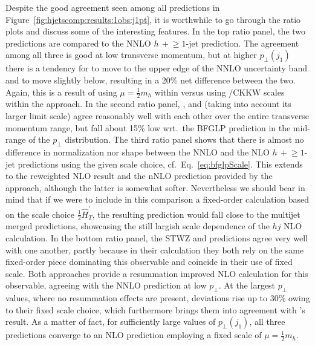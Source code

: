 Despite the good agreement seen among all predictions in
Figure~\ref{fig:hjetscomp:results:1obs:j1pt}, it is worthwhile to go
through the ratio plots and discuss some of the interesting features.
In the top ratio panel, the two \hjetscompNNLOPS predictions are compared to the
NNLO $h\,+\!\ge\!1$-jet prediction. The agreement among all three is
good at low transverse momentum, but at higher $p_\perp(j_1)$ there is
a tendency for \hjetscompSherpa \hjetscompNNLOPS to move to the upper edge of the NNLO 
uncertainty band and \hjetscompPowheg \hjetscompNNLOPS to move slightly below, resulting 
in a 20\% net difference between the two. Again, this is a result of using
$\mu=\tfrac{1}{2}m_h$ within \hjetscompSherpa versus using \hjetscompMinlo/CKKW scales within the
\hjetscompPowheg approach. In the second ratio panel, \hjetscompHerwig, \hjetscompSherpa and \hjetscompMGaMC
(taking into account its larger limit scale) agree reasonably well
with each other over the entire transverse momentum range, but fall
about 15\% low wrt.~the BFGLP prediction in the mid-range of the
$p_\perp$ distribution. The third ratio panel shows that there is almost no
difference in normalization nor shape between the NNLO and the NLO
$h\,+\!\ge\!1$-jet predictions using the given scale choice,
cf.~Eq.~\eqref{eq:bfglpScale}. This extends to the \hjetscompMinlo reweighted
NLO result and the nNLO prediction provided by the \hjetscompLoopsim approach,
although the latter is somewhat softer. Nevertheless we should bear in
mind that if we were to include in this comparison a fixed-order
calculation based on the scale choice $\tfrac{1}{2}\hat H_T^\prime$,
the resulting prediction would fall close to the multijet merged
predictions, showcasing the still largish scale dependence of the $hj$
NLO calculation. In the bottom ratio panel, the STWZ and \hjetscompResbos
predictions agree very well with one another, partly because in their
calculation they both rely on the same fixed-order piece dominating
this observable and coincide in their use of fixed scale. Both
approaches provide a resummation improved NLO calculation for this
observable, agreeing with the NNLO prediction at low $p_\perp$. At the
largest $p_\perp$ values, where no resummation effects are present,
deviations rise up to 30\% owing to their fixed scale choice, which
furthermore brings them into agreement with \hjetscompSherpa's \hjetscompNNLOPS result.
As a matter of fact, for sufficiently large values of $p_\perp(j_1)$,
all three predictions converge to an NLO prediction employing a fixed
scale of $\mu=\tfrac{1}{2}m_h$.

